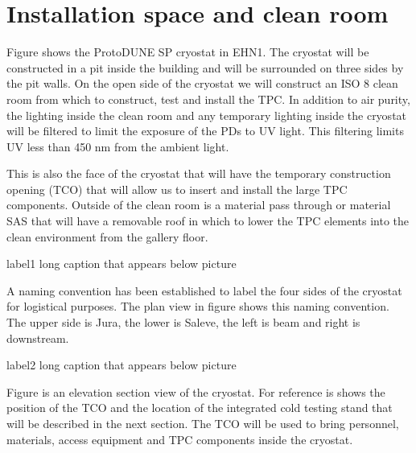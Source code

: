 
\section{Installation space and clean room}

Figure  shows the ProtoDUNE SP cryostat in EHN1.  The cryostat will be constructed in a pit inside the building and will be surrounded on three sides by the pit walls.  On the open side of the cryostat we will construct an ISO 8 clean room from which to construct, test and install the TPC.  In addition to air purity, the lighting inside the clean room and any temporary lighting inside the cryostat will be filtered to limit the exposure of the PDs to UV light.  This filtering limits UV less than 450 nm from the ambient light.  

This is also the face of the cryostat that will have the temporary construction opening (TCO) that will allow us to insert and install the large TPC components.  Outside of the clean room is a material pass through or material SAS that will have a removable roof in which to lower the TPC elements into the clean environment from the gallery floor.

\begin{cdrfigure}{label}{1 long caption that appears below picture}
\end{cdrfigure}

A naming convention has been established to label the four sides of the cryostat for logistical purposes.  The plan view in figure  shows this naming convention.  The upper side is Jura, the lower is Saleve, the left is beam and right is downstream.

\begin{cdrfigure}{label}{2 long caption that appears below picture}
\end{cdrfigure}

Figure  is an elevation section view of the cryostat.  For reference is shows the position of the TCO and the location of the integrated cold testing stand that will be described in the next section.  The TCO will be used to bring personnel, materials, access equipment and TPC components inside the cryostat. 

